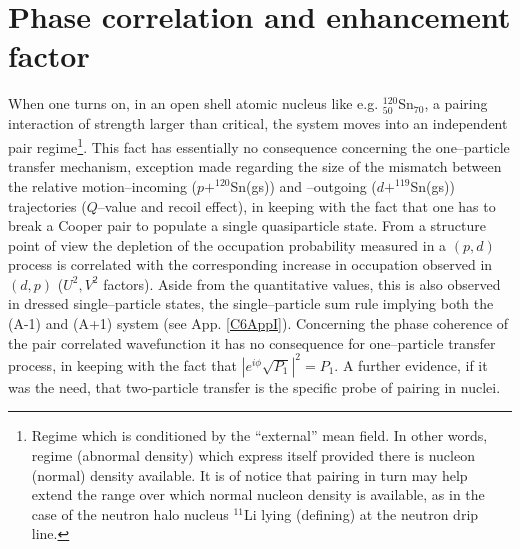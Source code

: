 \section{Phase correlation and enhancement factor}
When one turns on, in an open shell atomic nucleus like e.g. $^{120}_{50}$Sn$_{70}$, a pairing interaction of strength larger than critical, the system moves into an independent pair regime\footnote{Regime which is conditioned by the ``external'' mean field. In other words, regime (abnormal density) which express itself provided there is nucleon (normal) density available. It is of notice that pairing in turn may help extend the range over which normal nucleon density is available, as in the case of the neutron halo nucleus $^{11}$Li lying (defining) at the neutron drip line.}. This fact has essentially no consequence concerning the one--particle transfer mechanism, exception made regarding the size of the mismatch between the relative motion--incoming ($p+^{120}$Sn(gs)) and --outgoing ($d+^{119}$Sn(gs)) trajectories ($Q$--value and recoil effect), in keeping with the fact that one has to break a Cooper pair to populate a single  quasiparticle state. From a structure point of view the depletion of the occupation probability measured in a $(p,d)$ process is correlated with the corresponding increase in occupation observed in $(d,p)$ ($U^2,V^2$ factors). Aside  from the quantitative values, this is also observed in dressed single--particle states, the single--particle sum rule implying both the (A-1) and (A+1) system (see App. \ref{C6AppI}). Concerning the phase coherence of the pair correlated wavefunction it has no consequence for one--particle transfer process, in keeping with the fact that $|e^{i\phi}\sqrt{P_1}|^2=P_1$. A further evidence, if it was the need, that two-particle transfer is the specific probe of pairing in nuclei.


